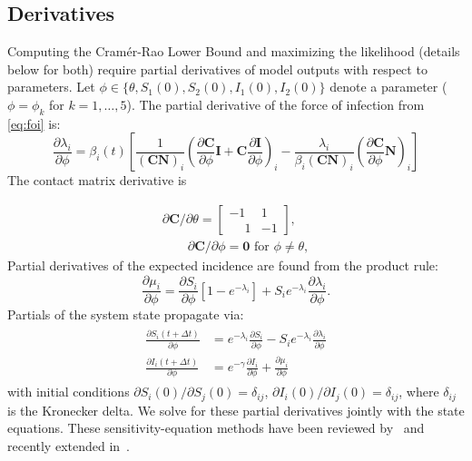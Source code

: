 \documentclass[9pt,twocolumn,twoside]{pnas-new}
\begin{document}
{\subsection*{Derivatives}\label{subsec:sens}
Computing the Cram\'er-Rao Lower Bound and maximizing the likelihood
(details below for both) require partial derivatives of model outputs
with respect to parameters. Let $\phi \in \{\theta, S_1(0), S_2(0),
I_1(0), I_2(0)\}$ denote a parameter ($\phi = \phi_k$ for $k = 1,
\dots, 5$). The partial derivative of the force of infection from
\eqref{eq:foi} is:
\begin{equation}\label{eq:sens_foi}
\frac{\partial \lambda_i}{\partial \phi} = \beta_i(t) \left[
\frac{1}{(\mathbf{C}\mathbf{N})_i}\left(
  \frac{\partial \mathbf{C}}{\partial \phi} \mathbf{I}
  + \mathbf{C} \frac{\partial \mathbf{I}}{\partial \phi}\right)_i
- \frac{\lambda_i}{\beta_i (\mathbf{C}\mathbf{N})_i}
  \left(\frac{\partial \mathbf{C}}{\partial \phi} \mathbf{N}\right)_i
\right]
\end{equation}
The contact matrix derivative is

\begin{align*}
\partial \mathbf{C}/\partial \theta =
\begin{bmatrix}
  -1 &  1 \\
  \phantom{-}1 & -1
\end{bmatrix},\\
\qquad
\partial \mathbf{C}/\partial \phi = \mathbf{0} \text{ for } \phi \neq \theta,
\end{align*}
Partial derivatives of the expected incidence are found from the
product rule:
\begin{equation}\label{eq:sens_mu}
  \frac{\partial \mu_i}{\partial \phi} =
  \frac{\partial S_i}{\partial \phi} [1 - e^{-\lambda_i}] + S_i
  e^{-\lambda_i} \frac{\partial \lambda_i}{\partial \phi}.
\end{equation}
Partials of the system state propagate via:
\begin{align}\begin{split}\label{eq:sens}
\frac{\partial S_i(t+\Delta t)}{\partial \phi} &= e^{-\lambda_i}
\frac{\partial S_i}{\partial \phi} - S_i e^{-\lambda_i}
\frac{\partial \lambda_i}{\partial \phi} \\
\frac{\partial I_i(t+\Delta t)}{\partial \phi} &= e^{-\gamma}
\frac{\partial I_i}{\partial \phi} +
\frac{\partial \mu_i}{\partial \phi}
\end{split}\end{align}
with initial conditions $\partial S_i(0)/\partial S_j(0) =
\delta_{ij}$, $\partial I_i(0)/\partial I_j(0) = \delta_{ij}$, where
$\delta_{ij}$ is the Kronecker delta. We solve for these partial
derivatives jointly with the state equations. These
sensitivity-equation methods have been reviewed
by~\citep{wu2013sensitivity} and recently extended
in~\citep{mester2022}.

}
\end{document}

